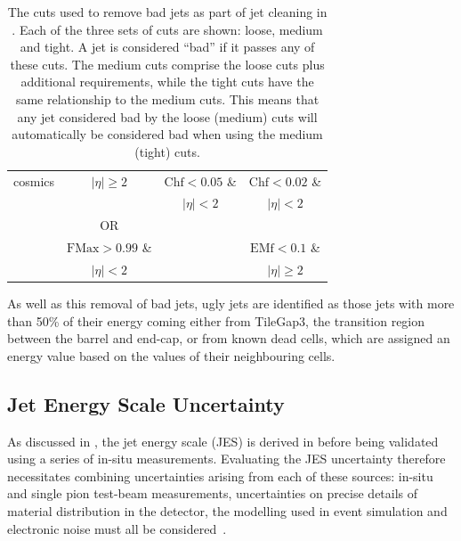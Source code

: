 \begin{table}
\begin{center}
\begin{tabular}{ l c c c }
  cosmics    & $|\eta| \geq 2$                  & $\text{Chf}<0.05$ \&          & $\text{Chf}<0.02$ \&  \\
             &                                  & $|\eta|<2$                    & $|\eta|<2$            \\
             & OR                               &                               &                       \\
             & $\text{FMax}>0.99$ \&            &                               & $\text{EMf}<0.1$ \&   \\
             & $|\eta|<2$                       &                               & $|\eta| \geq 2$       \\
  \end{tabular}
  \caption{The cuts used to remove bad jets as part of jet cleaning in \ATLAS.
           Each of the three sets of cuts are shown: loose, medium and tight. A
           jet is considered ``bad'' if it passes any of these cuts. The medium
           cuts comprise the loose cuts plus additional requirements, while the
           tight cuts have the same relationship to the medium cuts. This means
           that any jet considered bad by the loose (medium) cuts will
           automatically be considered bad when using the medium (tight) cuts.}
  \label{tab:analysis-tools:jet_cleaning}
\end{center}
\end{table}

As well as this removal of bad jets, ugly jets are identified as those jets
with more than 50\% of their energy coming either from TileGap3, the transition
region between the barrel and end-cap, or from known dead cells, which are
assigned an energy value based on the values of their neighbouring cells.

\subsection{Jet Energy Scale Uncertainty}
\label{sec:analysis-tools:jes_uncertainty}
As discussed in , the jet energy scale
(JES) is derived in \MC before being validated using a series of in-situ
measurements. Evaluating the JES uncertainty therefore necessitates combining
uncertainties arising from each of these sources: in-situ and single pion
test-beam measurements, uncertainties on precise details of material
distribution in the \ATLAS detector, the \MC modelling used in event simulation
and electronic noise must all be considered~\cite{ATLAS-CONF-2010-056,CERN-PH-EP-2011-191}.

